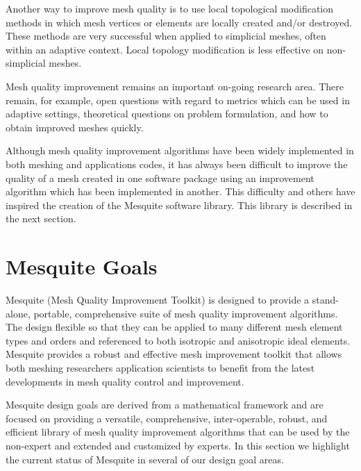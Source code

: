 Another way to improve mesh quality is to use local topological modification methods in which mesh vertices or elements are locally created and/or destroyed. These methods are very successful when applied to simplicial meshes, often within an adaptive context.  Local topology modification is less effective on non-simplicial meshes. \newline

Mesh quality improvement remains an important on-going research area. 
There remain, for example, open questions with regard to metrics which 
can be used in adaptive settings, theoretical questions on problem 
formulation, and how to obtain improved meshes quickly. \newline

Although mesh quality improvement algorithms have been widely implemented 
in both meshing and applications codes, it has always been difficult to 
improve the quality of a mesh created in one software package using an 
improvement algorithm which has been implemented in another.  This difficulty
and others have inspired the creation of the Mesquite software library. 
This library is described in the next section. \newline


\section{Mesquite Goals}
Mesquite (Mesh Quality Improvement Toolkit) is designed to provide a
stand-alone, portable, comprehensive suite of mesh quality improvement
algorithms.  The design flexible so that they can be applied to many
different mesh element types and orders and referenced to both
isotropic and anisotropic ideal elements.  Mesquite provides a robust
and effective mesh improvement toolkit that allows both meshing
researchers application scientists to benefit from the latest
developments in mesh quality control and improvement. \newline

Mesquite design goals are derived from a mathematical framework and
are focused on providing a versatile, comprehensive, inter-operable,
robust, and efficient library of mesh quality improvement algorithms
that can be used by the non-expert and extended and customized by
experts.  In this section we highlight the current status of Mesquite
in several of our design goal areas. \newline


